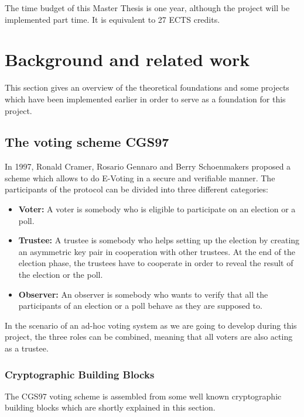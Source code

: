 \documentclass[numbers=noenddot, abstract=on]{scrreprt}
\begin{document}
The time budget of this Master Thesis is one year, although the project will be
implemented part time. It is equivalent to 27 ECTS credits. 

\chapter{Background and related work}
\label{cha:brw}
This section gives an overview of the theoretical foundations and some projects
which have been implemented earlier in order to serve as a foundation for this
project.

\section{The voting scheme CGS97}
\label{sec:CGS97}
In 1997, Ronald Cramer, Rosario Gennaro and Berry Schoenmakers proposed a scheme
\cite{CGS97} which allows to do E-Voting in a secure and verifiable manner. The participants of
the protocol can be divided into three different categories:
\begin{itemize}
  \item \textbf{Voter:} A voter is somebody who is eligible to participate on
  an election or a poll. 
  \item \textbf{Trustee:} A trustee is somebody who helps setting up the
  election by creating an asymmetric key pair in cooperation with other
  trustees.
  At the end of the election phase, the trustees have to cooperate in order to
  reveal the result of the election or the poll.
  \item \textbf{Observer:} An observer is somebody who wants to verify that all
  the participants of an election or a poll behave as they are supposed to.
\end{itemize}

In the scenario of an ad-hoc voting system as we are going to develop during
this project, the three roles can be combined, meaning that all voters are also
acting as a trustee. 

\subsection{Cryptographic Building Blocks}
\label{sec:buildingblocks}
The CGS97 voting scheme is assembled from some well known cryptographic building
blocks which are shortly explained in this section.
\end{document}
